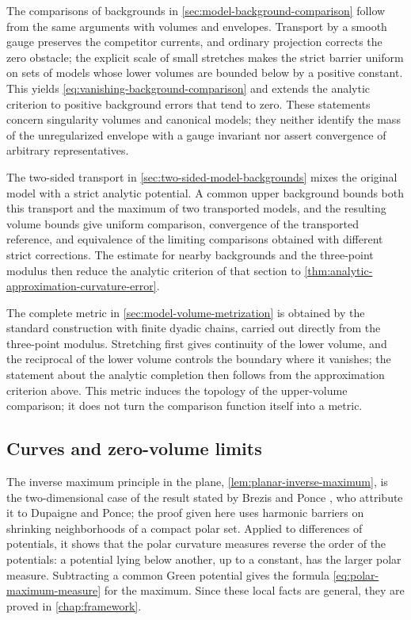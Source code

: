 The comparisons of backgrounds in \cref{sec:model-background-comparison} follow from the same arguments with volumes and envelopes. Transport by a smooth gauge preserves the competitor currents, and ordinary projection corrects the zero obstacle; the explicit scale of small stretches makes the strict barrier uniform on sets of models whose lower volumes are bounded below by a positive constant. This yields \eqref{eq:vanishing-background-comparison} and extends the analytic criterion to positive background errors that tend to zero. These statements concern singularity volumes and canonical models; they neither identify the mass of the unregularized envelope with a gauge invariant nor assert convergence of arbitrary representatives.

The two-sided transport in \cref{sec:two-sided-model-backgrounds} mixes the original model with a strict analytic potential. A common upper background bounds both this transport and the maximum of two transported models, and the resulting volume bounds give uniform comparison, convergence of the transported reference, and equivalence of the limiting comparisons obtained with different strict corrections. The estimate for nearby backgrounds and the three-point modulus then reduce the analytic criterion of that section to \cref{thm:analytic-approximation-curvature-error}.

The complete metric in \cref{sec:model-volume-metrization} is obtained by the standard construction with finite dyadic chains, carried out directly from the three-point modulus. Stretching first gives continuity of the lower volume, and the reciprocal of the lower volume controls the boundary where it vanishes; the statement about the analytic completion then follows from the approximation criterion above. This metric induces the topology of the upper-volume comparison; it does not turn the comparison function itself into a metric.

\subsection{Curves and zero-volume limits}

The inverse maximum principle in the plane, \cref{lem:planar-inverse-maximum}, is the two-dimensional case of the result stated by Brezis and Ponce \cite[Theorem 3.1]{BP04}, who attribute it to Dupaigne and Ponce; the proof given here uses harmonic barriers on shrinking neighborhoods of a compact polar set. Applied to differences of potentials, it shows that the polar curvature measures reverse the order of the potentials: a potential lying below another, up to a constant, has the larger polar measure. Subtracting a common Green potential gives the formula \eqref{eq:polar-maximum-measure} for the maximum. Since these local facts are general, they are proved in \cref{chap:framework}.

